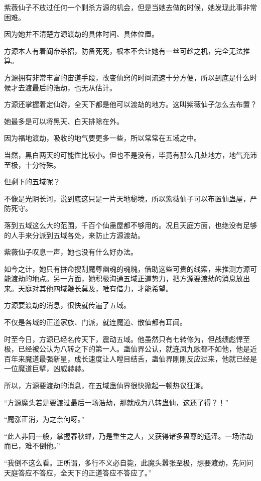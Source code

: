 \begin{this_body}
紫薇仙子不放过任何一个剿杀方源的机会，但是当她去做的时候，她发现此事非常困难。

因为她并不清楚方源渡劫的具体时间、具体位置。

方源本人有着阎帝杀招，防备死死，根本不会让她有一丝可趁之机，完全无法推算。

方源拥有非常丰富的宙道手段，改变仙窍的时间流速十分方便，所以到底是什么时候才去渡最后的浩劫，也无从估计。

方源还掌握着定仙游，全天下都是他可以渡劫的地方。这叫紫薇仙子怎么去布置？

她最多是可以将黑天、白天排除在外。

因为福地渡劫，吸收的地气要更多一些，所以常常在五域之中。

当然，黑白两天的可能性比较小。但也不是没有，毕竟有那么几处地方，地气充沛至极，十分特殊。

但剩下的五域呢？

不像是光阴长河，说到底这只是一片天地秘境，所以紫薇仙子可以布置仙蛊屋，严防死守。

落到五域这么大的范围，千百个仙蛊屋都不够用的。况且天庭方面，也绝没有足够的人手来分派到五域各处，来防止方源渡劫。

紫薇仙子叹息一声，她也没有什么好办法。

如今之计，她只有拼命搜刮魔尊幽魂的魂魄，借助这些可贵的线索，来推测方源可能渡劫的地点。另一方面，她积极沟通五域正道势力，把方源要渡劫的消息放出来。天庭对其他四域鞭长莫及，唯有借力，才能希望。

方源要渡劫的消息，很快就传遍了五域。

不仅是各域的正道家族、门派，就连魔道、散仙都有耳闻。

时至今日，方源已经名传天下，震动五域。他虽然只有七转修为，但战绩彪悍至极，已经被公认为八转之下的第一人。蛊仙界公认，就连凤九歌都不如他，他是近百年来魔道最强新星，成长速度让人瞠目结舌，蛊仙界刚刚反应过来，他就已经是一位魔道巨擘，凶威赫赫。

所以，方源要渡劫的消息，在五域蛊仙界很快掀起一顿热议狂潮。

“方源魔头若是要渡过最后一场浩劫，那就成为八转蛊仙，这还了得？！”

“魔涨正消，为之奈何呀。”

“此人非同一般，掌握春秋蝉，乃是重生之人，又获得诸多蛊尊的遗泽。一场浩劫而已，难不倒他。”

“我倒不这么看。正所谓，多行不义必自毙，此魔头嚣张至极，想要渡劫，先问问天庭答应不答应，全天下的正道答应不答应了。”


\end{this_body}
